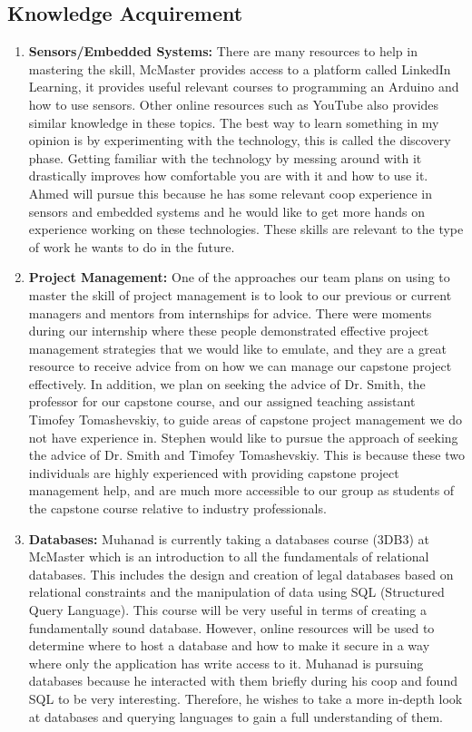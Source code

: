 \documentclass[12pt]{article}
\begin{document}
\newpage

\subsection{Knowledge Acquirement }

\begin{enumerate}
  \item \textbf{Sensors/Embedded Systems:} There are many resources to help in mastering the skill, McMaster provides access to a platform called LinkedIn Learning, it provides useful relevant courses to programming an Arduino and how to use sensors. Other online resources such as YouTube also provides similar knowledge in these topics. The best way to learn something in my opinion is by experimenting with the technology, this is called the discovery phase. Getting familiar with the technology by messing around with it drastically improves how comfortable you are with it and how to use it. Ahmed will pursue this because he has some relevant coop experience in sensors and embedded systems and he would like to get more hands on experience working on these technologies. These skills are relevant to the type of work he wants to do in the future.
  
  \item \textbf{Project Management:} One of the approaches our team plans on using to master the skill of project management is to look to our previous or current managers and mentors from internships for advice. There were moments during our internship where these people demonstrated effective project management strategies that we would like to emulate, and they are a great resource to receive advice from on how we can manage our capstone project effectively. In addition, we plan on seeking the advice of Dr. Smith, the professor for our capstone course, and our assigned teaching assistant Timofey Tomashevskiy, to guide areas of capstone project management we do not have experience in. Stephen would like to pursue the approach of seeking the advice of Dr. Smith and Timofey Tomashevskiy. This is because these two individuals are highly experienced with providing capstone project management help, and are much more accessible to our group as students of the capstone course relative to industry professionals.  
  
  \item \textbf{Databases:} Muhanad is currently taking a databases course (3DB3) at McMaster which is an introduction to all the fundamentals of relational databases. This includes the design and creation of legal databases based on relational constraints and the manipulation of data using SQL (Structured Query Language). This course will be very useful in terms of creating a fundamentally sound database. However, online resources will be used to determine where to host a database and how to make it secure in a way where only the application has write access to it. Muhanad is pursuing databases because he interacted with them briefly during his coop and found SQL to be very interesting. Therefore, he wishes to take a more in-depth look at databases and querying languages to gain a full understanding of them.
  

\end{enumerate}
\end{document}

